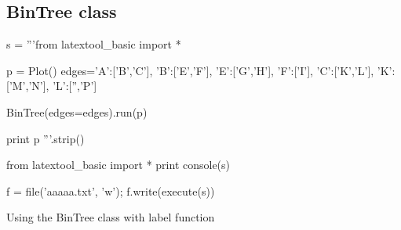 \newpage
\subsection{BinTree class}

\begin{python}
s = '''from latextool_basic import *

p = Plot()
edges={'A':['B','C'],
       'B':['E','F'],
       'E':['G','H'],
       'F':['I'],
       'C':['K','L'],
       'K':['M','N'],
       'L':['','P']}

BinTree(edges=edges).run(p)
     
print p
'''.strip()

from latextool_basic import *
print console(s)

f = file('aaaaa.txt', 'w'); f.write(execute(s))
\end{python}




\newpage
Using the BinTree class with label function






